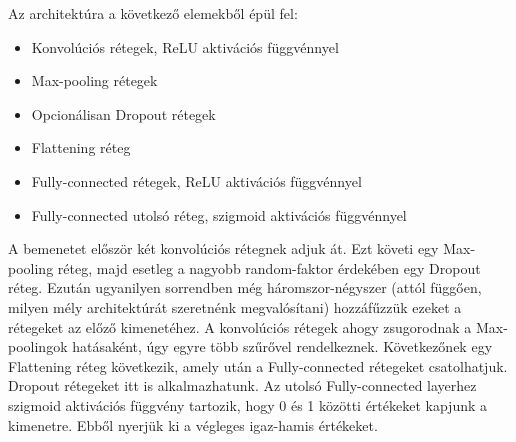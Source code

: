Az architektúra a következő elemekből épül fel:

\begin{itemize}
 \item Konvolúciós rétegek, ReLU aktivációs függvénnyel
 \item Max-pooling rétegek
 \item Opcionálisan Dropout rétegek
 \item Flattening réteg
 \item Fully-connected rétegek, ReLU aktivációs függvénnyel
 \item Fully-connected utolsó réteg, szigmoid aktivációs függvénnyel
\end{itemize}

A bemenetet először két konvolúciós rétegnek adjuk át. Ezt követi egy Max-pooling réteg, majd esetleg a nagyobb random-faktor érdekében egy Dropout réteg. Ezután ugyanilyen sorrendben még háromszor-négyszer (attól függően, milyen mély architektúrát szeretnénk megvalósítani) hozzáfűzzük ezeket a rétegeket az előző kimenetéhez. A konvolúciós rétegek ahogy zsugorodnak a Max-poolingok hatásaként, úgy egyre több szűrővel rendelkeznek. Következőnek egy Flattening réteg következik, amely után a Fully-connected rétegeket csatolhatjuk. Dropout rétegeket itt is alkalmazhatunk. Az utolsó Fully-connected layerhez szigmoid aktivációs függvény tartozik, hogy 0 és 1 közötti értékeket kapjunk a kimenetre. Ebből nyerjük ki a végleges igaz-hamis értékeket.


